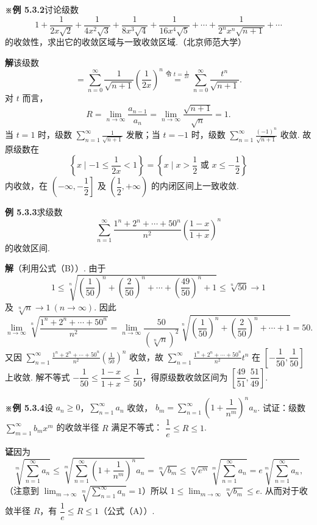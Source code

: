 \documentclass[UTF8, 12pt, fontset=fandol, oneside]{ctexart}
\begin{document}
\noindent\textbf{※例 5.3.2}\quad 讨论级数
\[
  1+\frac1{2x\sqrt2}+\frac1{4x^2\sqrt3}+\frac1{8x^3\sqrt4}
  +\frac1{16x^4\sqrt5}+\cdots+\frac1{2^nx^n\sqrt{n+1}}+\cdots
\]
的收敛性，求出它的收敛区域与一致收敛区域.（北京师范大学）

\noindent\textbf{解}\quad 该级数
\[
  =\sum_{n=0}^{\infty}\frac1{\sqrt{n+1}}\left(\frac1{2x}\right)^n
  \overset{\text{令 }t=\frac1{2x}}{=}
  \sum_{n=0}^{\infty}\frac{t^n}{\sqrt{n+1}}.
\]
对 $t$ 而言，
\[
  R=\lim_{n\to\infty}\frac{a_{n-1}}{a_n}
  =\lim_{n\to\infty}\frac{\sqrt{n+1}}{\sqrt n}=1.
\]
当 $t=1$ 时，级数 $\displaystyle\sum_{n=1}^{\infty}\frac1{\sqrt{n+1}}$ 发散；当 $t=-1$ 时，级数
$\displaystyle\sum_{n=1}^{\infty}\frac{(-1)^n}{\sqrt{n+1}}$ 收敛. 故原级数在
\[
  \left\{x\mid -1\le\frac1{2x}<1\right\}
  =\left\{x\mid x>\frac12\text{ 或 }x\le-\frac12\right\}
\]
内收敛，在 $\left(-\infty,-\dfrac12\right]$ 及 $\left(\dfrac12,+\infty\right)$ 的内闭区间上一致收敛.

\noindent\textbf{例 5.3.3}\quad 求级数
\[
  \sum_{n=1}^{\infty}\frac{1^n+2^n+\cdots+50^n}{n^2}
  \left(\frac{1-x}{1+x}\right)^n
\]
的收敛区间.

\noindent\textbf{解}\quad （利用公式（B））. 由于
\[
  1\le\sqrt[n]{\left(\frac1{50}\right)^n+\left(\frac2{50}\right)^n+\cdots+
  \left(\frac{49}{50}\right)^n+1}\le\sqrt[n]{50}\to1
\]
及 $\sqrt[n]{n}\to1\ (n\to\infty)$. 因此
\[
  \lim_{n\to\infty}\sqrt[n]{\frac{1^n+2^n+\cdots+50^n}{n^2}}
  =\lim_{n\to\infty}\frac{50}{(\sqrt[n]{n})^2}
  \sqrt[n]{\left(\frac1{50}\right)^n+\left(\frac2{50}\right)^n+\cdots+1}=50.
\]
又因 $\displaystyle\sum_{n=1}^{\infty}\frac{1^n+2^n+\cdots+50^n}{n^2}\left(\frac1{50}\right)^n$ 收敛，故
$\displaystyle\sum_{n=1}^{\infty}\frac{1^n+2^n+\cdots+50^n}{n^2}t^n$ 在
$\left[-\dfrac1{50},\dfrac1{50}\right]$ 上收敛. 解不等式
$-\dfrac1{50}\le\dfrac{1-x}{1+x}\le\dfrac1{50}$，得原级数收敛区间为
$\left[\dfrac{49}{51},\dfrac{51}{49}\right]$.

\noindent\textbf{※例 5.3.4}\quad 设 $a_n\ge0$，$\displaystyle\sum_{n=1}^{\infty}a_n$ 收敛，
$b_m=\displaystyle\sum_{n=1}^{\infty}\left(1+\dfrac1{n^m}\right)^n a_n$. 试证：级数
$\displaystyle\sum_{m=1}^{\infty}b_mx^m$ 的收敛半径 $R$ 满足不等式：
$\dfrac1e\le R\le1$.

\noindent\textbf{证}\quad 因为
\[
  \sqrt[m]{\sum_{n=1}^{\infty}a_n}
  \le\sqrt[m]{\sum_{n=1}^{\infty}\left(1+\frac1{n^m}\right)^n a_n}
  =\sqrt[m]{b_m}
  \le\sqrt[m]{e^m}\sqrt[m]{\sum_{n=1}^{\infty}a_n}
  =e\sqrt[m]{\sum_{n=1}^{\infty}a_n},
\]
（注意到 $\displaystyle\lim_{m\to\infty}\sqrt[m]{\sum_{n=1}^{\infty}a_n}=1$）所以
$1\le\displaystyle\lim_{m\to\infty}\sqrt[m]{b_m}\le e$. 从而对于收敛半径 $R$，有
$\dfrac1e\le R\le1$（公式（A））.
\end{document}
